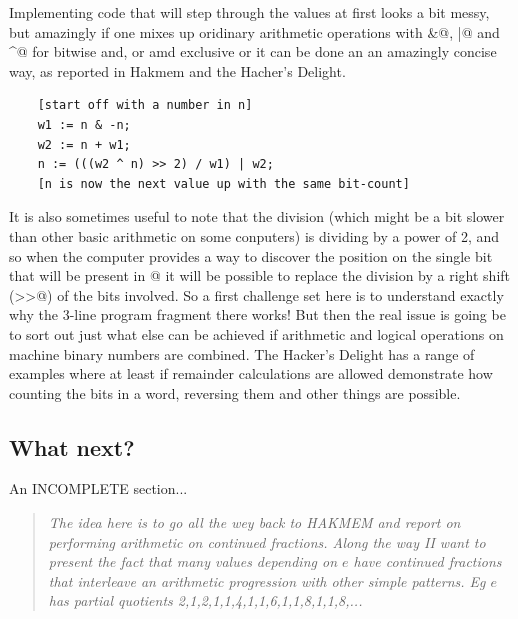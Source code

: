 Implementing code that will step through the values at first looks
a bit messy, but amazingly if one mixes up oridinary arithmetic
operations with \verb@&@, \verb@|@ and \verb@^@ for bitwise and, or
amd exclusive or it can be done an an amazingly concise way,
as reported in Hakmem\cite{hakmem} and the Hacher's
Delight\cite{hackersdelight}.
\begin{verbatim}
    [start off with a number in n]
    w1 := n & -n;
    w2 := n + w1;
    n := (((w2 ^ n) >> 2) / w1) | w2;
    [n is now the next value up with the same bit-count]
\end{verbatim}
It is also sometimes useful to note that the division (which might
be a bit slower than other basic arithmetic on some conputers) is
dividing by a power of 2, and so when the computer provides a way
to discover the position on the single bit that will be present in
@ it will be possible to replace the division by a right
shift (\verb@>>@) of the bits involved. So a first challenge set here is
to understand exactly why the 3-line program fragment there works! But then
the real issue is going be to sort out just what else can be achieved
if arithmetic and logical operations on machine binary numbers are
combined. The Hacker's Delight has a range of examples where at least
if remainder calculations are allowed demonstrate how counting the
bits in a word, reversing them and other things are possible.
\subsection{What next?}
An INCOMPLETE section...
\begin{quotation}\textit{
The idea here is to go all the wey back to HAKMEM and report on
performing arithmetic on continued fractions. Along the way II want to
present the fact that many values depending on $e$ have continued fractions
that interleave an arithmetic progression with other simple patterns.
Eg $e$ has partial quotients 2,1,2,1,1,4,1,1,6,1,1,8,1,1,8,...
}\end{quotation}

